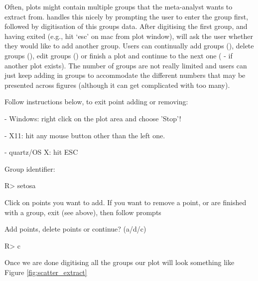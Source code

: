\documentclass[article]{jss}
\newcommand{\fct}[1]{\code{#1()}}
\begin{document}
Often, plots might contain multiple groups that the meta-analyst wants to extract from. \fct{metaDigitise} handles this nicely by prompting the user to enter the group first, followed by digitisation of this groups data. After digitising the first group, and having exited (e.g., hit `esc' on mac from plot window), \fct{metaDigitise} will ask the user whether they would like to add another group. Users can continually add groups (), delete groups (), edit groups () or finish a plot and continue to the next one ( - if another plot exists). 
The number of groups are not really limited and users can just keep adding in groups to accommodate the different numbers that may be presented across figures (although it can get complicated with too many).

\begin{CodeChunk}
\begin{CodeOutput}
Follow instructions below, to exit point adding or removing:

 - Windows: right click on the plot area and choose 'Stop'!

 - X11: hit any mouse button other than the left one.

 - quartz/OS X: hit ESC

Group identifier:
\end{CodeOutput}
\begin{CodeInput}
R> setosa
\end{CodeInput}
\begin{CodeOutput}
Click on points you want to add.
If you want to remove a point, or are finished with a
group, exit (see above), then follow prompts

Add points, delete points or continue? (a/d/c) 
\end{CodeOutput}
\begin{CodeInput}
R> c
\end{CodeInput}
\end{CodeChunk}

Once we are done digitising all the groups our plot will look something like Figure \ref{fig:scatter_extract}
\end{document}
